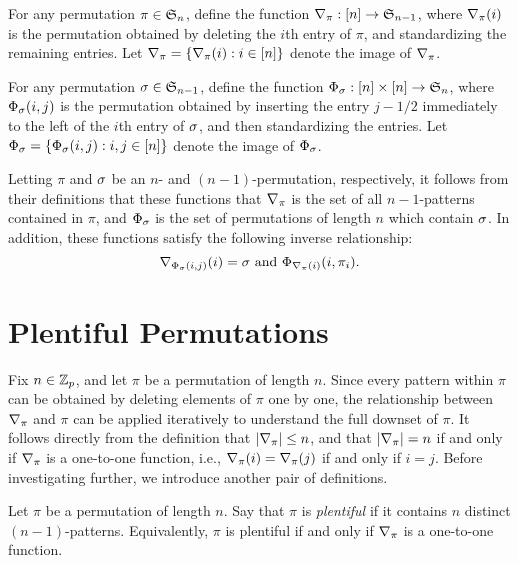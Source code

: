   \begin{definition} \label{fixpat:def:del}
    For any permutation $\pi \in \S_n$, define the function 
    $\del_\pi: [n] \ra \S_{n-1}$, where $\del_\pi(i)$ is the permutation
    obtained by deleting the $i$th entry of $\pi$, and standardizing the
    remaining entries. Let $\del_\pi = \{ \del_\pi(i) : i \in [n]\}$ denote the
    image of $\del_\pi$. 
  \end{definition}

  \begin{definition} \label{fixpat:def:ins}
    For any permutation $\sg \in \S_{n-1}$, define the function
    $\ins_\sg: [n] \times [n] \ra \S_n$, where $\ins_\sg(i,j)$ is the permutation
    obtained by inserting the entry $j - 1/2$ immediately to the left of the
    $i$th entry of $\sg$, and then standardizing the entries. 
    Let $\ins_\sg = \{\ins_\sg(i,j) : i, j \in [n]\}$ denote the image of
    $\ins_\sg$. 
  \end{definition}

  Letting $\pi$ and $\sg$ be an $n$- and $(n-1)$-permutation, respectively, 
  it follows from their definitions that these functions that $\del_\pi$ is the
  set of all $n-1$-patterns contained in $\pi$, and $\ins_\sg$ is the set of
  permutations of length $n$ which contain $\sg$. In addition, these functions satisfy the
  following inverse relationship:
  $$ \del_{\ins_\sg(i,j)}(i) = \sg \text{ and } \ins_{\del_{\pi}(i)}(i, \pi_i).$$


\section{Plentiful Permutations}
  
    Fix $n \in \Zp$, and let $\pi$ be a permutation of length $n$. Since every pattern
    within $\pi$ can be obtained by deleting elements of $\pi$ one by one,
    the relationship between $\del_\pi$ and $\pi$ can be applied iteratively to
    understand the full downset of $\pi$. It follows directly from the definition
    that $|\del_\pi| \leq n$, and that $|\del_\pi| = n$ if and only if
    $\del_\pi$ is a one-to-one function, i.e., $\del_\pi(i) = \del_\pi(j)$ if
    and only if $i=j$. Before investigating further, we introduce another pair
    of definitions. 

    \begin{definition} 
    \label{fixpat:def:plentiful}
      Let $\pi$ be a permutation of length $n$. Say that $\pi$ is \emph{plentiful} if it
      contains $n$ distinct $(n-1)$-patterns. Equivalently, $\pi$ is plentiful
      if and only if $\delpi$ is a one-to-one function. 
    \end{definition}
    
